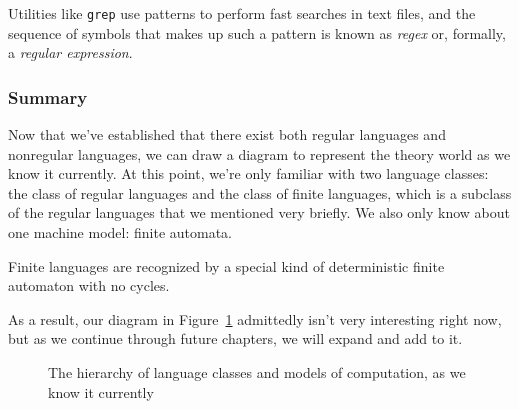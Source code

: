 Utilities like \texttt{grep} use patterns to perform fast searches in text files, and the sequence of symbols that makes up such a pattern is known as \emph{regex} or, formally, a \emph{regular expression}.





%


\subsubsection*{Summary}

Now that we've established that there exist both regular languages and nonregular languages, we can draw a diagram to represent the theory world as we know it currently. At this point, we're only familiar with two language classes: the class of regular languages and the class of finite languages, which is a subclass of the regular languages that we mentioned very briefly. We also only know about one machine model: finite automata.

\begin{remark}
Finite languages are recognized by a special kind of deterministic finite automaton with no cycles.
\end{remark}

As a result, our diagram in Figure~\ref{fig:chomskyregular} admittedly isn't very interesting right now, but as we continue through future chapters, we will expand and add to it.

\begin{figure}[h]
\centering
{}
\caption{The hierarchy of language classes and models of computation, as we know it currently}
\label{fig:chomskyregular}
\end{figure}

